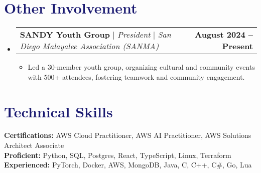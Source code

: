 \documentclass[letterpaper,11pt]{article}
\makeatletter
\newcommand{\resumeItem}[1]{
  \item\small{
    {#1 \vspace{-2pt}}
  }
}
\newcommand{\resumeProjectHeading}[2]{
    \item
    \begin{tabular*}{1.001\textwidth}{l@{\extracolsep{\fill}}r}
      \small#1 & \textbf{\small #2}\\
    \end{tabular*}\vspace{-7pt}
}
\newcommand{\resumeSubHeadingListStart}{\begin{itemize}[leftmargin=0.0in, label={}]}
\newcommand{\resumeSubHeadingListEnd}{\end{itemize}}
\newcommand{\resumeItemListStart}{\begin{itemize}}
\newcommand{\resumeItemListEnd}{\end{itemize}\vspace{-5pt}}
\newcommand\accentColor{MidnightBlue}
\makeatother
\begin{document}
\section{\textcolor{\accentColor}{Other Involvement}}
    \vspace{-7pt}
    \resumeSubHeadingListStart
    \resumeProjectHeading
        {\textbf{SANDY Youth Group} $|$ \emph{President} $|$ \emph{San Diego Malayalee Association (SANMA)}}{August 2024 -- Present}
        \resumeItemListStart
            \resumeItem{Led a 30-member youth group, organizing cultural and community events with 500+ attendees, fostering teamwork and community engagement.}
        \resumeItemListEnd
    \resumeSubHeadingListEnd
\vspace{-15pt}
    
\section{\textcolor{\accentColor}{Technical Skills}}
 \begin{itemize}[leftmargin=0.15in, label={}]
    \small{\item{
    \textbf{Certifications: }{AWS Cloud Practitioner, AWS AI Practitioner, AWS Solutions Architect Associate} \\
    \textbf{Proficient: }{Python, SQL, Postgres, React, TypeScript, Linux, Terraform} \\
    \textbf{Experienced: }{PyTorch, Docker, AWS, MongoDB, Java, C, C++, C\#, Go, Lua}
    }}
 \end{itemize}
 \vspace{-8pt}
\end{document}
